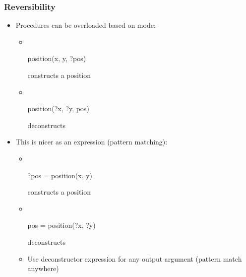 \documentclass[12pt]{beamer}
\begin{document}
\begin{frame}[fragile]
\frametitle{Reversibility}
\begin{itemize}
\item Procedures can be overloaded based on mode:
  \begin{itemize}
  \item \\[-1ex]
    \begin{minipage}{0.45\linewidth}
      \begin{block}{}
\begin{semiverbatim}
position(x, y, ?pos)
\end{semiverbatim}
      \end{block}
    \end{minipage} \quad constructs a position
  \item \\[-1ex]
    \begin{minipage}{0.45\linewidth}
      \begin{block}{}
\begin{semiverbatim}
position(?x, ?y, pos)
\end{semiverbatim}
      \end{block}
    \end{minipage} \quad deconstructs
  \end{itemize}
\item This is nicer as an expression (pattern matching):
  \begin{itemize}
  \item \\[-1ex]
    \begin{minipage}{0.45\linewidth}
      \begin{block}{}
\begin{semiverbatim}
?pos = position(x, y)
\end{semiverbatim}
      \end{block}
    \end{minipage} \quad constructs a position
  \item \\[-1ex]
    \begin{minipage}{0.45\linewidth}
      \begin{block}{}
\begin{semiverbatim}
pos = position(?x, ?y)
\end{semiverbatim}
      \end{block}
    \end{minipage} \quad deconstructs
  \item Use deconstructor expression for any output argument
    (pattern match anywhere)
  \end{itemize}
\end{itemize}
\end{frame}
\end{document}
